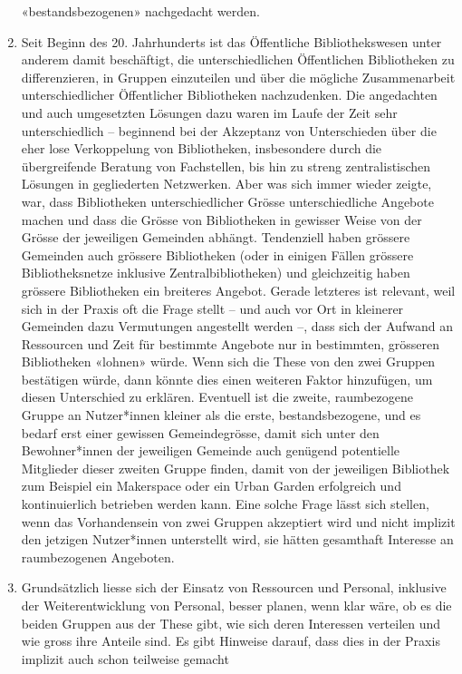 \documentclass[a4paper,
fontsize=11pt,
oneside,
numbers=noperiodatend,
parskip=half-,
bibliography=totoc,
final
]{scrartcl}
\begin{document}
\begin{enumerate}
  «bestandsbezogenen» nachgedacht werden.
\item
  Seit Beginn des 20. Jahrhunderts ist das Öffentliche Bibliothekswesen
  unter anderem damit beschäftigt, die unterschiedlichen Öffentlichen
  Bibliotheken zu differenzieren, in Gruppen einzuteilen und über die
  mögliche Zusammenarbeit unterschiedlicher Öffentlicher Bibliotheken
  nachzudenken. Die angedachten und auch umgesetzten Lösungen dazu waren
  im Laufe der Zeit sehr unterschiedlich -- beginnend bei der Akzeptanz
  von Unterschieden über die eher lose Verkoppelung von Bibliotheken,
  insbesondere durch die übergreifende Beratung von Fachstellen, bis hin
  zu streng zentralistischen Lösungen in gegliederten Netzwerken. Aber
  was sich immer wieder zeigte, war, dass Bibliotheken unterschiedlicher
  Grösse unterschiedliche Angebote machen und dass die Grösse von
  Bibliotheken in gewisser Weise von der Grösse der jeweiligen Gemeinden
  abhängt. Tendenziell haben grössere Gemeinden auch grössere
  Bibliotheken (oder in einigen Fällen grössere Bibliotheksnetze
  inklusive Zentralbibliotheken) und gleichzeitig haben grössere
  Bibliotheken ein breiteres Angebot. Gerade letzteres ist relevant,
  weil sich in der Praxis oft die Frage stellt -- und auch vor Ort in
  kleinerer Gemeinden dazu Vermutungen angestellt werden --, dass sich
  der Aufwand an Ressourcen und Zeit für bestimmte Angebote nur in
  bestimmten, grösseren Bibliotheken «lohnen» würde. Wenn sich die These
  von den zwei Gruppen bestätigen würde, dann könnte dies einen weiteren
  Faktor hinzufügen, um diesen Unterschied zu erklären. Eventuell ist
  die zweite, raumbezogene Gruppe an Nutzer*innen kleiner als die erste,
  bestandsbezogene, und es bedarf erst einer gewissen Gemeindegrösse,
  damit sich unter den Bewohner*innen der jeweiligen Gemeinde auch
  genügend potentielle Mitglieder dieser zweiten Gruppe finden, damit
  von der jeweiligen Bibliothek zum Beispiel ein Makerspace oder ein
  Urban Garden erfolgreich und kontinuierlich betrieben werden kann.
  Eine solche Frage lässt sich stellen, wenn das Vorhandensein von zwei
  Gruppen akzeptiert wird und nicht implizit den jetzigen Nutzer*innen
  unterstellt wird, sie hätten gesamthaft Interesse an raumbezogenen
  Angeboten.
\item
  Grundsätzlich liesse sich der Einsatz von Ressourcen und Personal,
  inklusive der Weiterentwicklung von Personal, besser planen, wenn klar
  wäre, ob es die beiden Gruppen aus der These gibt, wie sich deren
  Interessen verteilen und wie gross ihre Anteile sind. Es gibt Hinweise
  darauf, dass dies in der Praxis implizit auch schon teilweise gemacht

\end{enumerate}
\end{document}
